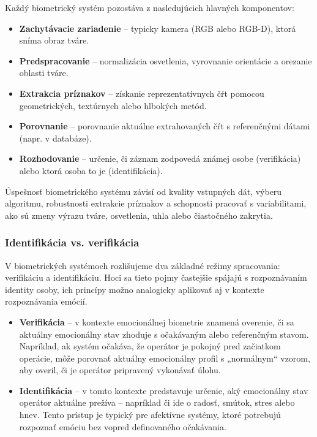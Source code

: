 Každý biometrický systém pozostáva z nasledujúcich hlavných komponentov:
\begin{itemize}
    \item \textbf{Zachytávacie zariadenie} -- typicky kamera (RGB alebo RGB-D), ktorá sníma obraz tváre.
    \item \textbf{Predspracovanie} -- normalizácia osvetlenia, vyrovnanie orientácie a orezanie oblasti tváre.
    \item \textbf{Extrakcia príznakov} -- získanie reprezentatívnych čŕt pomocou geometrických, textúrnych alebo hlbokých metód.
    \item \textbf{Porovnanie} -- porovnanie aktuálne extrahovaných čŕt s referenčnými dátami (napr. v databáze).
    \item \textbf{Rozhodovanie} -- určenie, či záznam zodpovedá známej osobe (verifikácia) alebo ktorá osoba to je (identifikácia).
\end{itemize}

Úspešnosť biometrického systému závisí od kvality vstupných dát, výberu algoritmu, robustnosti extrakcie príznakov a schopnosti pracovať s variabilitami, ako sú zmeny výrazu tváre, osvetlenia, uhla alebo čiastočného zakrytia.
\subsubsection{Identifikácia vs. verifikácia}

V biometrických systémoch rozlišujeme dva základné režimy spracovania: verifikáciu a identifikáciu. Hoci sa tieto pojmy častejšie spájajú s rozpoznávaním identity osoby, ich princípy možno analogicky aplikovať aj v kontexte rozpoznávania emócií.

\begin{itemize}
    \item \textbf{Verifikácia} -- v kontexte emocionálnej biometrie znamená overenie, či sa aktuálny emocionálny stav zhoduje s očakávaným alebo referenčným stavom. Napríklad, ak systém očakáva, že operátor je pokojný pred začiatkom operácie, môže porovnať aktuálny emocionálny profil s „normálnym“ vzorom, aby overil, či je operátor pripravený vykonávať úlohu.
    \item \textbf{Identifikácia} -- v tomto kontexte predstavuje určenie, aký emocionálny stav operátor aktuálne prežíva – napríklad či ide o radosť, smútok, stres alebo hnev. Tento prístup je typický pre afektívne systémy, ktoré potrebujú rozpoznať emóciu bez vopred definovaného očakávania.
\end{itemize}

